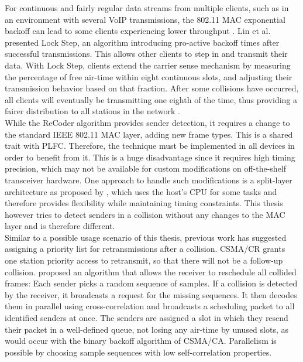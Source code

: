 For continuous and fairly regular data streams from multiple clients, such as in an environment with several VoIP transmissions, the 802.11 \gls{MAC} exponential backoff can lead to some clients experiencing lower throughput \cite{lin2009}. Lin et al. presented Lock Step, an algorithm introducing pro-active backoff times after successful transmissions. This allows other clients to step in and transmit their data. With Lock Step, clients extend the carrier sense mechanism by measuring the percentage of free air-time within eight continuous slots, and adjusting their transmission behavior based on that fraction. After some collisions have occurred, all clients will eventually be transmitting one eighth of the time, thus providing a fairer distribution to all stations in the network \cite{lin2009}.\\

While the ReCoder algorithm provides sender detection, it requires a change to the standard IEEE 802.11 \gls{MAC} layer, adding new frame types. This is a shared trait with \gls{PLFC}. Therefore, the technique must be implemented in all devices in order to benefit from it. This is a huge disadvantage since it requires high timing precision, which may not be available for custom modifications on off-the-shelf transceiver hardware. One approach to handle such modifications is a split-layer architecture as proposed by \cite{nychis2009}, which uses the host's CPU for some tasks and therefore provides flexibility while maintaining timing constraints. This thesis however tries to detect senders in a collision without any changes to the \gls{MAC} layer and is therefore different.\\

Similar to a possible usage scenario of this thesis, previous work has suggested assigning a priority list for retransmissions after a collision. \gls{CSMA/CR} \cite{choi2013} grants one station priority access to retransmit, so that there will not be a follow-up collision. \cite{zhao2015} proposed an algorithm that allows the receiver to reschedule all collided frames: Each sender picks a random sequence of samples. If a collision is detected by the receiver, it broadcasts a request for the missing sequences. It then decodes them in parallel using cross-correlation and broadcasts a scheduling packet to all identified senders at once. The senders are assigned a slot in which they resend their packet in a well-defined queue, not losing any air-time by unused slots, as would occur with the binary backoff algorithm of \gls{CSMA/CA}. Parallelism is possible by choosing sample sequences with low self-correlation properties.


